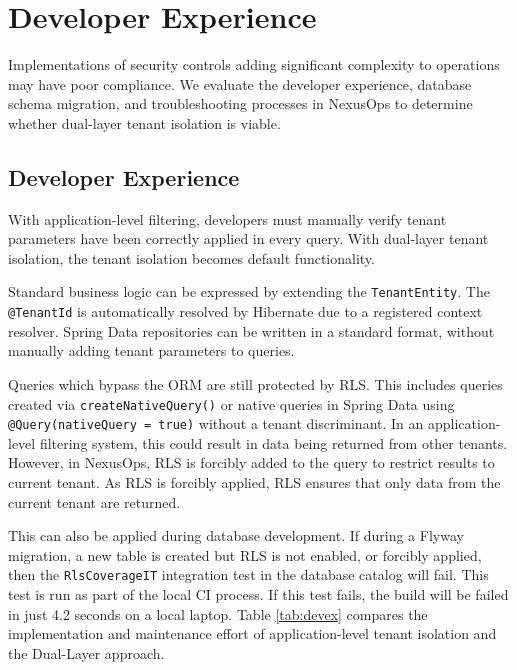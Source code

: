 \documentclass[conference]{IEEEtran}
\begin{document}
\section{Developer Experience}
\label{sec:developer_experience}

Implementations of security controls adding significant complexity to operations may have poor compliance. We evaluate the developer experience, database schema migration, and troubleshooting processes in NexusOps to determine whether dual-layer tenant isolation is viable.

\subsection{Developer Experience}
With application-level filtering, developers must manually verify tenant parameters have been correctly applied in every query. With dual-layer tenant isolation, the tenant isolation becomes default functionality.

Standard business logic can be expressed by extending the \texttt{TenantEntity}. The \texttt{@TenantId} is automatically resolved by Hibernate due to a registered context resolver. Spring Data repositories can be written in a standard format, without manually adding tenant parameters to queries.

Queries which bypass the ORM are still protected by RLS. This includes queries created via \texttt{createNativeQuery()} or native queries in Spring Data using \texttt{@Query(nativeQuery = true)} without a tenant discriminant. In an application-level filtering system, this could result in data being returned from other tenants. However, in NexusOps, RLS is forcibly added to the query to restrict results to current tenant. As RLS is forcibly applied, RLS ensures that only data from the current tenant are returned.

This can also be applied during database development. If during a Flyway migration, a new table is created but RLS is not enabled, or forcibly applied, then the \texttt{RlsCoverageIT} integration test in the database catalog will fail. This test is run as part of the local CI process. If this test fails, the build will be failed in just 4.2 seconds on a local laptop. Table \ref{tab:devex} compares the implementation and maintenance effort of application-level tenant isolation and the Dual-Layer approach.
\end{document}
